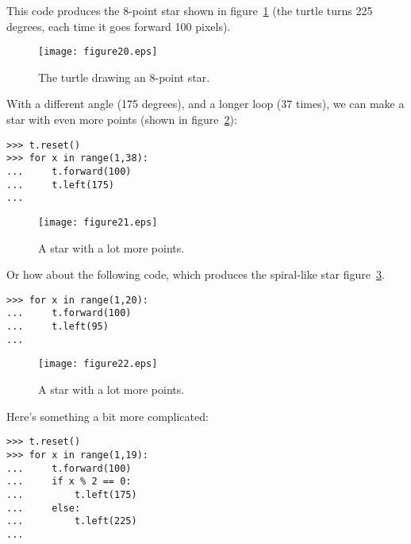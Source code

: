 This code produces the 8-point star shown in figure~\ref{fig20} (the turtle turns 225 degrees, each time it goes forward 100 pixels).

\begin{figure}
\begin{center}
\texttt{[image: figure20.eps]}
\end{center}
\caption{The turtle drawing an 8-point star.}\label{fig20}
\end{figure}

\noindent
With a different angle (175 degrees), and a longer loop (37 times), we can make a star with even more points (shown in figure~\ref{fig21}):

\begin{listing}
\begin{verbatim}
>>> t.reset()
>>> for x in range(1,38):
...     t.forward(100)
...     t.left(175)
...
\end{verbatim}
\end{listing}

\begin{figure}
\begin{center}
\texttt{[image: figure21.eps]}
\end{center}
\caption{A star with a lot more points.}\label{fig21}
\end{figure}

\noindent
Or how about the following code, which produces the spiral-like star figure~\ref{fig22}.

\begin{listing}
\begin{verbatim}
>>> for x in range(1,20):
...     t.forward(100)
...     t.left(95)
...
\end{verbatim}
\end{listing}

\begin{figure}
\begin{center}
\texttt{[image: figure22.eps]}
\end{center}
\caption{A star with a lot more points.}\label{fig22}
\end{figure}

\noindent
Here's something a bit more complicated:

\begin{listing}
\begin{verbatim}
>>> t.reset()
>>> for x in range(1,19):
...     t.forward(100)
...     if x % 2 == 0:
...         t.left(175)
...     else:
...         t.left(225)
...
\end{verbatim}
\end{listing}

